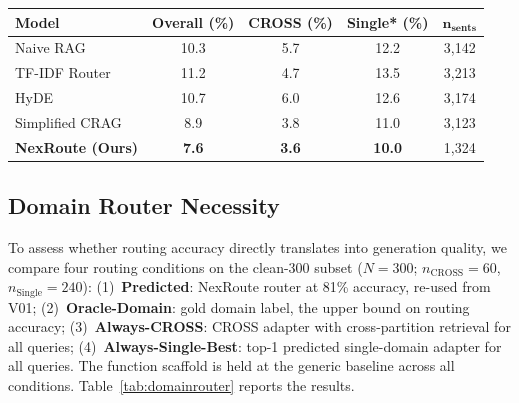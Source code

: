 \documentclass[a4paper,fleql]{cas-sc}
\begin{document}
\vspace{4pt}
\begin{center}
\begingroup
{}
\label{tab:hallucination-excl-law}
\begin{tabular}{lcccc}
\toprule
\textbf{Model} & \textbf{Overall (\%)} & \textbf{CROSS (\%)} & \textbf{Single* (\%)} & $\boldsymbol{n_{\text{sents}}}$ \\
\midrule
Naive RAG              & 10.3 & 5.7 & 12.2 & 3{,}142 \\
TF-IDF Router          & 11.2 & 4.7 & 13.5 & 3{,}213 \\
HyDE                   & 10.7 & 6.0 & 12.6 & 3{,}174 \\
Simplified CRAG        &  8.9 & 3.8 & 11.0 & 3{,}123 \\
\textbf{NexRoute (Ours)} & \textbf{7.6} & \textbf{3.6} & \textbf{10.0} & 1{,}324 \\
\bottomrule
\end{tabular}
\endgroup
\end{center}
\vspace{4pt}

\subsection{Domain Router Necessity}
\label{ssec:domainrouter}
To assess whether routing accuracy directly translates into generation quality,
we compare four routing conditions on the clean-300 subset
($N{=}300$; $n_{\text{CROSS}}{=}60$, $n_{\text{Single}}{=}240$):
(1)~\textbf{Predicted}: NexRoute router at 81\% accuracy, re-used from V01;
(2)~\textbf{Oracle-Domain}: gold domain label, the upper bound on routing accuracy;
(3)~\textbf{Always-CROSS}: CROSS adapter with cross-partition retrieval for all queries;
(4)~\textbf{Always-Single-Best}: top-1 predicted single-domain adapter for all queries.
The function scaffold is held at the generic baseline across all conditions.
Table~\ref{tab:domainrouter} reports the results.
\end{document}
